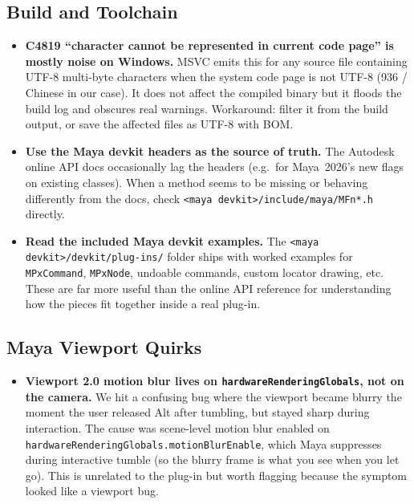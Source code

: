 \documentclass[12pt]{article}
\begin{document}
\subsection*{Build and Toolchain}

\begin{itemize}
  \item \textbf{C4819 ``character cannot be represented in current code
    page'' is mostly noise on Windows.}  MSVC emits this for any source
    file containing UTF-8 multi-byte characters when the system code page
    is not UTF-8 (936 / Chinese in our case).  It does not affect the
    compiled binary but it floods the build log and obscures real
    warnings.  Workaround: filter it from the build output, or save the
    affected files as UTF-8 with BOM.

  \item \textbf{Use the Maya devkit headers as the source of truth.}  The
    Autodesk online API docs occasionally lag the headers (e.g.\ for
    Maya~2026's new flags on existing classes).  When a method seems to
    be missing or behaving differently from the docs, check
    \texttt{<maya devkit>/include/maya/MFn*.h} directly.

  \item \textbf{Read the included Maya devkit examples.}  The
    \texttt{<maya devkit>/devkit/plug-ins/} folder ships with worked
    examples for \texttt{MPxCommand}, \texttt{MPxNode}, undoable commands,
    custom locator drawing, etc.  These are far more useful than the
    online API reference for understanding how the pieces fit together
    inside a real plug-in.
\end{itemize}

\subsection*{Maya Viewport Quirks}

\begin{itemize}
  \item \textbf{Viewport 2.0 motion blur lives on
    \texttt{hardwareRenderingGlobals}, not on the camera.}  We hit a
    confusing bug where the viewport became blurry the moment the user
    released Alt after tumbling, but stayed sharp during interaction.
    The cause was scene-level motion blur enabled on
    \texttt{hardwareRenderingGlobals.motionBlurEnable}, which Maya
    suppresses during interactive tumble (so the blurry frame is what you
    see when you let go).  This is unrelated to the plug-in but worth
    flagging because the symptom looked like a viewport bug.
\end{itemize}
\end{document}
